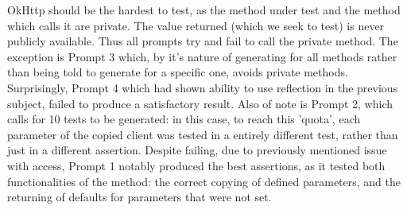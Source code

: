 OkHttp should be the hardest to test, as the method under test and the method which calls it are private. The value returned (which we seek to test) is never publicly available.
Thus all prompts try and fail to call the private method. The exception is Prompt 3 which, by it's nature of generating for all methods rather than being told to generate for a specific one, avoids private methods. Surprisingly, Prompt 4 which had shown ability to use reflection in the previous subject, failed to produce a satisfactory result. Also of note is Prompt 2, which calls for 10 tests to be generated: in this case, to reach this 'quota', each parameter of the copied client was tested in a entirely different test, rather than just in a different assertion.
Despite failing, due to previously mentioned issue with access, Prompt 1 notably produced the best assertions, as it tested both functionalities of the method: the correct copying of defined parameters, and the returning of defaults for parameters that were not set.

